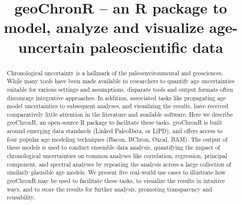 \documentclass[gchron, manuscript]{copernicus}
\begin{document}
\title{geoChronR -- an R package to model, analyze and visualize age-uncertain
paleoscientific data}














\received{}
\pubdiscuss{} %
\revised{}
\accepted{}
\published{}




\maketitle


\begin{abstract}
Chronological uncertainty is a hallmark of the paleoenvironmental and
geosciences. While many tools have been made available to researchers to
quantify age uncertainties suitable for various settings and
assumptions, disparate tools and output formats often discourage
integrative approaches. In addition, associated tasks like propagating
age model uncertainties to subsequent analyses, and visualizing the
results, have received comparatively little attention in the literature
and available software. Here we describe geoChronR, an open-source R
package to facilitate these tasks. geoChronR is built around emerging
data standards (Linked PaleoData, or LiPD), and offers access to four
popular age modeling techniques (Bacon, BChron, Oxcal, BAM). The output
of these models is used to conduct ensemble data analysis, quantifying
the impact of chronological uncertainties on common analyses like
correlation, regression, principal component, and spectral analyses by
repeating the analysis across a large collection of similarly plausible
age models. We present five real-world use cases to illustrate how
geoChronR may be used to facilitate these tasks, to visualize the
results in intuitive ways, and to store the results for further
analysis, promoting transparency and reusability.
\end{abstract}
\end{document}
